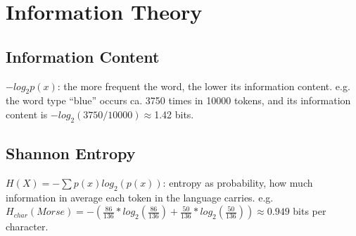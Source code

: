 \section{Information Theory}

\subsection*{Information Content}
$-log_2 p(x)$: the more frequent the word, the lower its information content.
e.g. the word type “blue” occurs ca. 3750 times in
10000 tokens, and its information content is $-log_2(3750/10000) \approx$1.42 bits.

\subsection*{Shannon Entropy}
$H(X) = - \sum p(x) log_2(p(x))$: entropy as probability, how much information in average each token in the language carries. e.g. $H_{char}(Morse) = - (\frac{86}{136} * log_2(\frac{86}{136}) + \frac{50}{136} * log_2(\frac{50}{136})) \approx 0.949$ bits per character.
